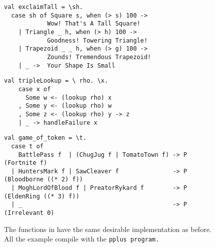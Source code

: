 \documentclass[manuscript,screen,review, 12pt, nonacm]{acmart}
\begin{document}
    \begin{figure}[ht] 
      \begin{minipage}[h]{0.54\linewidth}
        \pplst 
        \begin{lstlisting}[numbers=none, basicstyle=\tiny, xleftmargin=.2em,
          showstringspaces=false,
          frame=single]
val exclaimTall = \sh.
  case sh of Square s, when (> s) 100 -> 
            Wow! That's A Tall Square!  
    | Triangle _ h, when (> h) 100 ->
            Goodness! Towering Triangle!
    | Trapezoid _ _ h, when (> g) 100 -> 
            Zounds! Tremendous Trapezoid!
    | _ ->  Your Shape Is Small
  \end{lstlisting}
          \label{fig:ppexclaimtall} 
      \end{minipage}%
      \begin{minipage}[h]{0.5\linewidth}
        \pplst 
        \begin{lstlisting}[numbers=none, basicstyle=\tiny, xleftmargin=2em,
                      frame=single]
  val tripleLookup = \ rho. \x.
    case x of 
      Some w <- (lookup rho) x
    , Some y <- (lookup rho) w
    , Some z <- (lookup rho) y -> z
    | _ -> handleFailure x

   \end{lstlisting}
            \label{fig:pptriplelookup} 
        \vspace{4ex}
      \end{minipage} 
      \begin{minipage}[h]{\linewidth}
        \pplst 
        \begin{lstlisting}[numbers=none, basicstyle=\tiny, xleftmargin=9em,
          showstringspaces=false,
          frame=single]
val game_of_token = \t. 
  case t of  
    BattlePass f  | (ChugJug f | TomatoTown f) -> P (Fortnite f)
  | HuntersMark f | SawCleaver f               -> P (Bloodborne ((* 2) f))
  | MoghLordOfBlood f | PreatorRykard f        -> P (EldenRing ((* 3) f))
  | _                                          -> P (Irrelevant 0)
\end{lstlisting}
          \label{fig:ppgot}
      \vspace{4ex}
      \end{minipage}%
      \caption{The functions in \PPlus have the same desirable implementation as
      before. All the example compile with the \tt{pplus} program.}
  \label{fig:ppfuncs}
    \end{figure}        
    
\end{document}
